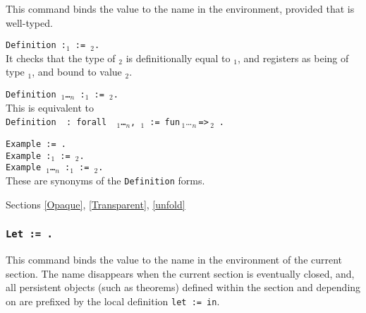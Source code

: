 This command binds the value {\term} to the name {\ident} in the
environment, provided that {\term} is well-typed.

\begin{ErrMsgs}
\item {}
\end{ErrMsgs}

\begin{Variants}
\item {\tt Definition {\ident} {\tt :}{\term$_1$} := {\term$_2$}.}\\
  It checks that the type of {\term$_2$} is definitionally equal to
  {\term$_1$}, and registers {\ident} as being of type {\term$_1$},
  and bound to value {\term$_2$}.
\item {\tt Definition {\ident} {\binder$_1$}\ldots{\binder$_n$}
       {\tt :}\term$_1$ {\tt :=} {\term$_2$}.}\\
  This is equivalent to \\
   {\tt Definition\,{\ident}\,{\tt :\,forall}\,%
       {\binder$_1$}\ldots{\binder$_n$}{\tt ,}\,\term$_1$\,{\tt :=}}\,%
       {\tt fun}\,{\binder$_1$}\ldots{\binder$_n$}\,{\tt =>}\,{\term$_2$}\,%
       {\tt .}

\item {\tt Example {\ident} := {\term}.}\\
{\tt Example {\ident} {\tt :}{\term$_1$} := {\term$_2$}.}\\
{\tt Example {\ident} {\binder$_1$}\ldots{\binder$_n$}
       {\tt :}\term$_1$ {\tt :=} {\term$_2$}.}\\
These are synonyms of the {\tt Definition} forms.
\end{Variants}

\begin{ErrMsgs}
\item {}
\end{ErrMsgs}

\SeeAlso Sections \ref{Opaque}, \ref{Transparent}, \ref{unfold}

\subsubsection{\tt Let {\ident} := {\term}.
}

This command binds the value {\term} to the name {\ident} in the
environment of the current section. The name {\ident} disappears
when the current section is eventually closed, and, all
persistent objects (such as theorems) defined within the
section and depending on {\ident} are prefixed by the local definition
{\tt let {\ident} := {\term} in}.

